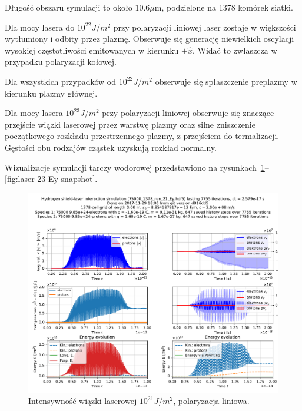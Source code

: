 Długość obszaru symulacji to około $10.6 \mu$m, podzielone na 1378 komórek siatki.

Dla mocy lasera do $10^{22} J/m^2$ przy polaryzacji liniowej %
laser zostaje w większości wytłumiony i odbity przez plazmę. Obserwuje się generację niewielkich oscylacji wysokiej częstotliwości emitowanych w kierunku $+\hat{x}$.
Widać to zwłaszcza w przypadku polaryzacji kołowej.

Dla wszystkich przypadków od $10^{22} J/m^2$ obserwuje się spłaszczenie preplazmy w kierunku plazmy głównej.



Dla mocy lasera $10^{23} J/m^2$ przy polaryzacji liniowej %
obserwuje się znaczące przejście wiązki laserowej przez warstwę plazmy oraz silne zniszczenie początkowego rozkładu przestrzennego plazmy, z przejściem do termalizacji.
Gęstości obu rodzajów cząstek uzyskują rozkład normalny.

Wizualizacje symulacji tarczy wodorowej przedstawiono na rysunkach~\ref{fig:laser-21-Ey}--\ref{fig:laser-23-Ey-snapshot}.







\begin{figure}[h!]
  \includegraphics[width=\textwidth]{Images/75000_1378_run_21_Ey}
  \caption{Intensywność wiązki laserowej $10^{21} J/m^2$, polaryzacja liniowa.\label{fig:laser-21-Ey}}
\end{figure}

